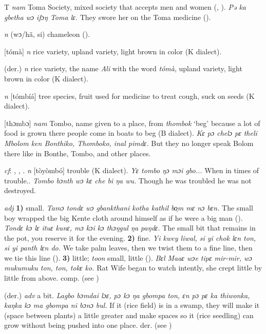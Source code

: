 \begin{letter}{T}
 \textit{nam} Toma Society, mixed society that accepts men and women (\citealt{Pichl1967}, \citealt{Hall1938}). \textit{Pə ka gbetha wɔ ifɔŋ Toma lɛ.} They swore her on the Toma medicine (\citealt{Pichl1967}). 

 \textit{n} (wɔ/hã, si) chameleon (\citealt{Pichl1967}). 

 [tómà] \textit{n} rice variety, upland variety, light brown in color (K dialect).

 (der.) \textit{n} rice variety, the name \textit{Ali} with the word \textit{tómà}, upland variety, light brown in color (K dialect). 

 \textit{n} [tómbíá] tree species, fruit used for medicine to treat cough, suck on seeds (K dialect). 

 [thɔmbɔ] \textit{nam} Tombo, name given to a place, from \textit{thombok} ‘beg' because a lot of food is grown there people come in boats to beg (B dialect). \textit{Kɛ pɔ chelɔ pɛ theli Mbolom ken Bonthiko, Thomboko, inal pimdɛ.} But they no longer speak Bolom there like in Bonthe, Tombo, and other places. 

 \textit{cf}: , , . \textit{n} [tòyòmbó] trouble (K dialect). \textit{Yɛ tombo ŋɔ mɔi gbo...} When in times of trouble.. \textit{Tombo bɔnth wɔ kɛ che bi ŋa wu.} Though he was troubled he was not destroyed.

 \textit{adj} \textbf{1)} small. \textit{Tamɔ tondɛ wɔ gbankthani kotha kathil bo̹m mɛ nɔ bɛn.} The small boy wrapped the big Kente cloth around himself as if he were a big man (\citealt{Pichl1967}). \textit{Tondɛ kɔ lɛ ituɛ kunɛ, mɔ kɔi kɔ thɔŋgul ŋa paŋdɛ.} The small bit that remains in the pot, you reserve it for the evening. \textbf{2)} fine. \textit{Yi kwey liwal, si yi chok lɛn ton, si yi panth lɛn do.} We take palm leaves, then we twist them to a fine line, then we tie this line (\citealt{Pichl1967}). \textbf{3)} little; \textit{toon} small, little (\citealt{Pichl1967}). \textit{Bɛl Maaɛ wɔe tipɛ mir-mir, wɔ mukumuku ton, ton, tokɛ ko.} Rat Wife began to watch intently, she crept little by little from above. comp.  (see ) 

 (der.) \textit{adv} a bit. \textit{Lagbo bɔmdai lɔɛ, pɔ kɔ ŋa gbompa ton, ɛn pɔ pɛ ka thiwonka, kaŋka kɔ ma gbompa ni bɔnɔ bul.} If it (rice field) is in a swamp, they will make it (space between plants) a little greater and make spaces so it (rice seedling) can grow without being pushed into one place. der.  (see )


\end{letter}
